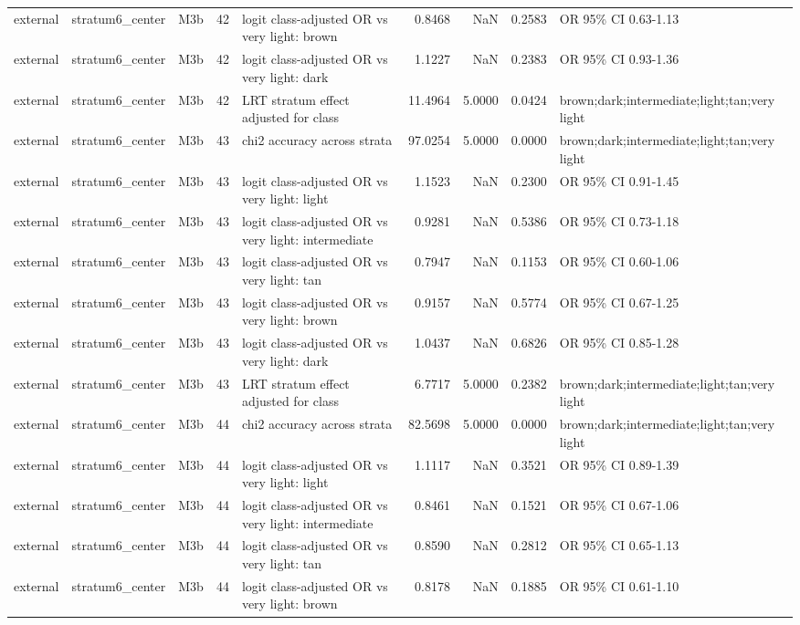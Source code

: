\begin{tabular}{lllrlrrrl}
external & stratum6\_center & M3b & 42 & logit class-adjusted OR vs very light: brown & 0.8468 & NaN & 0.2583 & OR 95\% CI 0.63-1.13 \\
external & stratum6\_center & M3b & 42 & logit class-adjusted OR vs very light: dark & 1.1227 & NaN & 0.2383 & OR 95\% CI 0.93-1.36 \\
external & stratum6\_center & M3b & 42 & LRT stratum effect adjusted for class & 11.4964 & 5.0000 & 0.0424 & brown;dark;intermediate;light;tan;very light \\
external & stratum6\_center & M3b & 43 & chi2 accuracy across strata & 97.0254 & 5.0000 & 0.0000 & brown;dark;intermediate;light;tan;very light \\
external & stratum6\_center & M3b & 43 & logit class-adjusted OR vs very light: light & 1.1523 & NaN & 0.2300 & OR 95\% CI 0.91-1.45 \\
external & stratum6\_center & M3b & 43 & logit class-adjusted OR vs very light: intermediate & 0.9281 & NaN & 0.5386 & OR 95\% CI 0.73-1.18 \\
external & stratum6\_center & M3b & 43 & logit class-adjusted OR vs very light: tan & 0.7947 & NaN & 0.1153 & OR 95\% CI 0.60-1.06 \\
external & stratum6\_center & M3b & 43 & logit class-adjusted OR vs very light: brown & 0.9157 & NaN & 0.5774 & OR 95\% CI 0.67-1.25 \\
external & stratum6\_center & M3b & 43 & logit class-adjusted OR vs very light: dark & 1.0437 & NaN & 0.6826 & OR 95\% CI 0.85-1.28 \\
external & stratum6\_center & M3b & 43 & LRT stratum effect adjusted for class & 6.7717 & 5.0000 & 0.2382 & brown;dark;intermediate;light;tan;very light \\
external & stratum6\_center & M3b & 44 & chi2 accuracy across strata & 82.5698 & 5.0000 & 0.0000 & brown;dark;intermediate;light;tan;very light \\
external & stratum6\_center & M3b & 44 & logit class-adjusted OR vs very light: light & 1.1117 & NaN & 0.3521 & OR 95\% CI 0.89-1.39 \\
external & stratum6\_center & M3b & 44 & logit class-adjusted OR vs very light: intermediate & 0.8461 & NaN & 0.1521 & OR 95\% CI 0.67-1.06 \\
external & stratum6\_center & M3b & 44 & logit class-adjusted OR vs very light: tan & 0.8590 & NaN & 0.2812 & OR 95\% CI 0.65-1.13 \\
external & stratum6\_center & M3b & 44 & logit class-adjusted OR vs very light: brown & 0.8178 & NaN & 0.1885 & OR 95\% CI 0.61-1.10 \\

\end{tabular}
